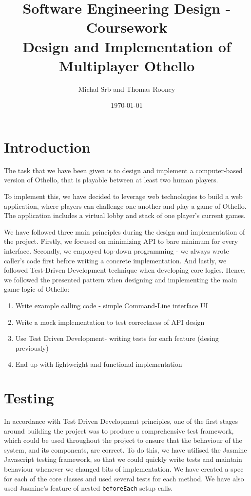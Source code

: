 \documentclass[a4wide, 11pt]{article}
\begin{document}
\title{Software Engineering Design - Coursework \\ Design and Implementation of Multiplayer Othello}

\author{Michal Srb and Thomas Rooney}

\date{\today}         %

\maketitle            %

\section{Introduction}

The task that we have been given is to design and implement a computer-based version of Othello, that is playable between at least two human players.

To implement this, we have decided to leverage web technologies to build a web application, where players can challenge one another and play a game of Othello. The application includes a virtual lobby and stack of one player's current games.

We have followed three main principles during the design and implementation of the project. Firstly, we focused on minimizing API to bare minimum for every interface. Secondly, we employed top-down programming - we always wrote caller's code first before writing a concrete implementation. And lastly, we followed Test-Driven Development technique when developing core logics. Hence, we followed the presented pattern when designing and implementing the main game logic of Othello:
\begin{enumerate}
\item Write example calling code - simple Command-Line interface UI
\item Write a mock implementation to test correctness of API design
\item Use Test Driven Development- writing tests for each feature (desing previously)
\item End up with lightweight and functional implementation
\end{enumerate}

\section{Testing}
In accordance with Test Driven Development principles, one of the first stages around building the project was to produce a comprehensive test framework, which could be used throughout the project to ensure that the behaviour of the system, and its components, are correct. To do this, we have utilised the Jasmine Javascript testing framework, so that we could quickly write tests and maintain behaviour whenever we changed bits of implementation. We have created a spec for each of the core classes and used several tests for each method. We have also used Jasmine's feature of nested \texttt{beforeEach} setup calls.
\end{document}
